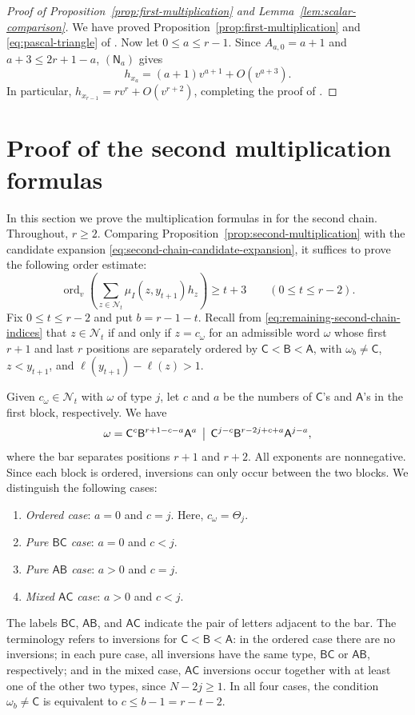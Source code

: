 \documentclass[11pt,a4paper,reqno]{amsart}
\numberwithin{equation}{section}
\theoremstyle{definition}
\theoremstyle{remark}
\theoremstyle{plain}
\newcommand{\ord}{\operatorname{ord}_v}
\newcommand{\A}{\mathsf A}
\newcommand{\B}{\mathsf B}
\newcommand{\CC}{\mathsf C}
\newcommand{\mus}{\mu_I}
\begin{document}
\begin{proof}[Proof of Proposition~\ref{prop:first-multiplication} and
Lemma~\ref{lem:scalar-comparison}]
We have proved Proposition~\ref{prop:first-multiplication} and \cref{eq:pascal-triangle} of .
Now let $0\leq a\leq r-1$.
Since $A_{a,0}=a+1$ and $a+3\leq 2r+1-a$, $(\mathsf N_{a})$ gives
\[
 h_{x_a}=(a+1)v^{a+1}+O(v^{a+3}).
\]
In particular, $h_{x_{r-1}}=rv^r+O(v^{r+2})$, completing the proof of .
\end{proof}




\section{Proof of the second multiplication formulas}
\label{sec:second-multiplication-proof}
In this section we prove the multiplication formulas in  for the second chain.
Throughout, $r\geq2$.
Comparing Proposition~\ref{prop:second-multiplication} with the candidate expansion \eqref{eq:second-chain-candidate-expansion}, it suffices to prove the following order estimate:
\begin{equation}\label{eq:second-chain-required-order}
 \ord\left(\sum_{z\in\mathcal N_t}
       \mus(z,y_{t+1})h_z\right)\geq t+3
 \qquad(0\leq t\leq r-2).
\end{equation}
Fix $0\leq t\leq r-2$ and put $b=r-1-t$.
Recall from \eqref{eq:remaining-second-chain-indices} that $z\in\mathcal N_t$ if and only if $z=c_\omega$ for an admissible word $\omega$ whose first $r+1$ and last $r$ positions are separately ordered by $\CC<\B<\A$, with $\omega_b\ne\CC$, $z<y_{t+1}$, and
$\ell(y_{t+1})-\ell(z)>1$.

Given $c_\omega\in \mathcal N_t$ with $\omega$ of type $j$, let $c$ and $a$ be the numbers of $\CC$'s and $\A$'s in the first block, respectively.
We have
\[
 \omega=\CC^c\B^{r+1-c-a}\A^a\,\bigm|\,
         \CC^{j-c}\B^{r-2j+c+a}\A^{j-a},
\]
where the bar separates positions $r+1$ and $r+2$.
All exponents are nonnegative.
Since each block is ordered, inversions can only occur between the two blocks.
We distinguish the following cases:
\begin{enumerate}[label=\textup{(\roman*)}]
\item \emph{Ordered case}: $a=0$ and $c=j$. Here, $c_\omega=\Theta_j$.
\item \emph{Pure $\B\CC$ case}: $a=0$ and $c<j$. 
\item \emph{Pure $\A\B$ case}: $a>0$ and $c=j$. 
\item \emph{Mixed $\A\CC$ case}: $a>0$ and $c<j$.
\end{enumerate}
The labels $\B\CC$, $\A\B$, and $\A\CC$ indicate the pair of letters adjacent to the bar.
The terminology refers to inversions for $\CC<\B<\A$: in the ordered case there are no inversions; in each pure case, all inversions have the same type, $\B\CC$ or $\A\B$, respectively; and in the mixed case, $\A\CC$ inversions occur together with at least one of the other two types, since $N-2j\geq1$.
In all four cases, the condition $\omega_b\ne\CC$ is equivalent to $c\leq b-1=r-t-2$.
\end{document}
